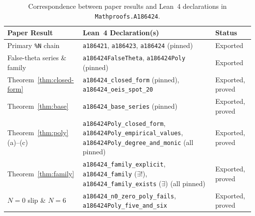 \documentclass[11pt]{article}
\theoremstyle{definition}
\begin{document}
\begin{table}[ht]
\centering
\caption{Correspondence between paper results and Lean~4 declarations in \nolinkurl{Mathproofs.A186424}.}
\label{tab:lean-map}
\smallskip
{\small
\begin{tabular}{@{}l >{\raggedright\arraybackslash}p{7.8cm} l@{}}
\toprule
Paper Result & Lean~4 Declaration(s) & Status \\
\midrule
Primary \texttt{\%N} chain & \texttt{a186421}, \texttt{a186423}, \texttt{a186424} (pinned) & Exported \\
False-theta series \& family & \texttt{a186424FalseTheta}, \texttt{a186424Poly} (pinned) & Exported \\
Theorem~\ref{thm:closed-form} & \texttt{a186424\_closed\_form} (pinned), \texttt{a186424\_oeis\_spot\_20} & Exported, proved \\
Theorem~\ref{thm:base} & \texttt{a186424\_base\_series} (pinned) & Exported, proved \\
Theorem~\ref{thm:poly}(a)--(c) & \texttt{a186424Poly\_closed\_form}, \texttt{a186424Poly\_empirical\_values}, \texttt{a186424Poly\_degree\_and\_monic} (all pinned) & Exported, proved \\
Theorem~\ref{thm:family} & \texttt{a186424\_family\_explicit}, \texttt{a186424\_family} ($\exists!$), \texttt{a186424\_family\_exists} ($\exists$) (all pinned) & Exported, proved \\
$N = 0$ slip \& $N = 6$ & \texttt{a186424\_n0\_zero\_poly\_fails}, \texttt{a186424Poly\_five\_and\_six} & Exported, proved \\
\bottomrule
\end{tabular}
}
\end{table}
\end{document}
